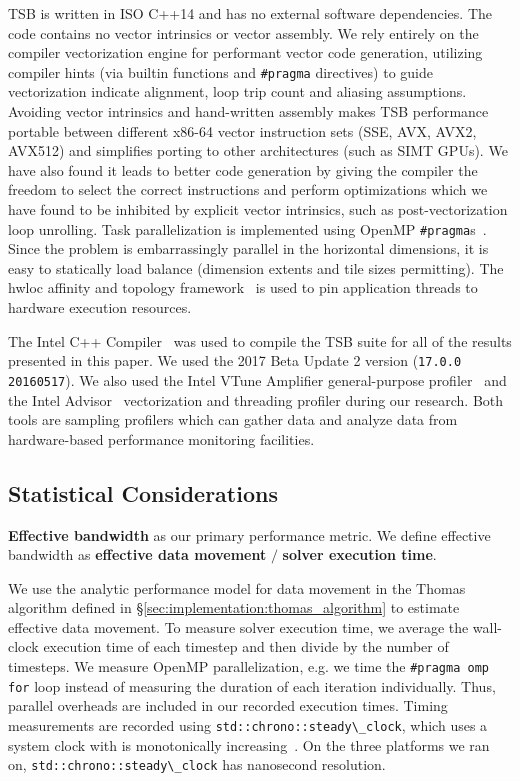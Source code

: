 \documentclass{sig-alternate-05-2015}
\begin{document}
TSB is written in ISO C++14 and has no external software dependencies.
The code contains no vector intrinsics or vector assembly.
We rely entirely on the compiler vectorization engine for performant vector code
  generation, utilizing compiler hints (via builtin functions and
  \lstinline{#pragma} directives) to guide vectorization indicate alignment, loop
  trip count and aliasing assumptions.
Avoiding vector intrinsics and hand-written assembly makes TSB performance
  portable between different x86-64 vector instruction sets (SSE, AVX, AVX2,
  AVX512) and simplifies porting to other architectures (such as SIMT GPUs).
We have also found it leads to better code generation by giving the compiler
  the freedom to select the correct instructions and perform optimizations which
  we have found to be inhibited by explicit vector intrinsics, such as
  post-vectorization loop unrolling.
Task parallelization is implemented using OpenMP
  \lstinline{#pragma}s~\cite{openmp}.
Since the problem is embarrassingly parallel in the horizontal dimensions, it
  is easy to statically load balance (dimension extents and tile sizes
  permitting).
The hwloc affinity and topology framework~\cite{hwloc} is used to pin
  application threads to hardware execution resources.

The Intel C++ Compiler~\cite{intel_cpp_compiler} was used to compile the TSB
  suite for all of the results presented in this paper.
We used the 2017 Beta Update 2 version (\lstinline{17.0.0 20160517}).
We also used the Intel VTune Amplifier general-purpose
  profiler~\cite{intel_vtune_amplifier} and the Intel
  Advisor~\cite{intel_advisor} vectorization and threading profiler during our
  research.
Both tools are sampling profilers which can gather data and analyze data from
  hardware-based performance monitoring facilities.

\subsection{Statistical Considerations}
\label{sec:experimental_setup:stats}

\textbf{Effective bandwidth} as our primary performance metric.
We define effective bandwidth as \textbf{effective data movement} \(/\)
  \textbf{solver execution time}.

We use the analytic performance model for data movement in the Thomas algorithm
  defined in \S\ref{sec:implementation:thomas_algorithm} to estimate effective
  data movement.
To measure solver execution time, we average the wall-clock execution time of
  each timestep and then divide by the number of timesteps.
We measure OpenMP parallelization, e.g. we time the \lstinline{#pragma omp for}
  loop instead of measuring the duration of each iteration individually.
Thus, parallel overheads are included in our recorded execution times.
Timing measurements are recorded using \lstinline{std::chrono::steady\_clock},
  which uses a system clock with is monotonically
  increasing~\cite{cpp14_standard_chrono_steady_clock}.
On the three platforms we ran on, \lstinline{std::chrono::steady\_clock} has
  nanosecond resolution.
\end{document}
